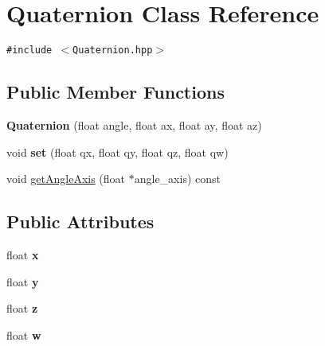 \hypertarget{classm3g_1_1Quaternion}{
\section{Quaternion Class Reference}
\label{classm3g_1_1Quaternion}
}
{\tt \#include $<$Quaternion.hpp$>$}

\subsection*{Public Member Functions}
\begin{CompactItemize}
\item 
\hypertarget{classm3g_1_1Quaternion_7a06a28b864e525f73a1bb0eb3e9274e}{
\textbf{Quaternion} (float angle, float ax, float ay, float az)}
\label{classm3g_1_1Quaternion_7a06a28b864e525f73a1bb0eb3e9274e}

\item 
\hypertarget{classm3g_1_1Quaternion_0712dc357557a30ac0da0a9d4cdd278c}{
void \textbf{set} (float qx, float qy, float qz, float qw)}
\label{classm3g_1_1Quaternion_0712dc357557a30ac0da0a9d4cdd278c}

\item 
void \hyperlink{classm3g_1_1Quaternion_3049675269aef6bb333d8f83fdf6eed7}{getAngleAxis} (float $\ast$angle\_\-axis) const 
\end{CompactItemize}
\subsection*{Public Attributes}
\begin{CompactItemize}
\item 
\hypertarget{classm3g_1_1Quaternion_d0da36b2558901e21e7a30f6c227a45e}{
float \textbf{x}}
\label{classm3g_1_1Quaternion_d0da36b2558901e21e7a30f6c227a45e}

\item 
\hypertarget{classm3g_1_1Quaternion_a4f0d3eebc3c443f9be81bf48561a217}{
float \textbf{y}}
\label{classm3g_1_1Quaternion_a4f0d3eebc3c443f9be81bf48561a217}

\item 
\hypertarget{classm3g_1_1Quaternion_f73583b1e980b0aa03f9884812e9fd4d}{
float \textbf{z}}
\label{classm3g_1_1Quaternion_f73583b1e980b0aa03f9884812e9fd4d}

\item 
\hypertarget{classm3g_1_1Quaternion_56eca241e2896b9f57a79589e76fd24b}{
float \textbf{w}}
\label{classm3g_1_1Quaternion_56eca241e2896b9f57a79589e76fd24b}

\end{CompactItemize}


